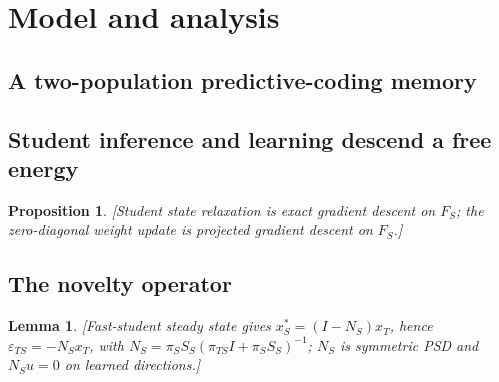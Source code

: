 \documentclass[10pt,letterpaper]{article}
\theoremstyle{plain}
\newtheorem{lemma}{Lemma}
\newtheorem{proposition}{Proposition}
\theoremstyle{remark}
\begin{document}
\section{Model and analysis}

\subsection{A two-population predictive-coding memory}

\subsection{Student inference and learning descend a free energy}
\begin{proposition}\label{prop:descent}
\textit{[Student state relaxation is exact gradient descent on $F_S$; the
zero-diagonal weight update is projected gradient descent on $F_S$.]}
\end{proposition}

\subsection{The novelty operator}
\begin{lemma}\label{lem:novelty}
\textit{[Fast-student steady state gives $x_S^*=(I-N_S)x_T$, hence
$\varepsilon_{TS}=-N_S x_T$, with $N_S=\pi_S S_S(\pi_{TS}I+\pi_S S_S)^{-1}$; $N_S$ is
symmetric PSD and $N_S u=0$ on learned directions.]}
\end{lemma}
\end{document}
